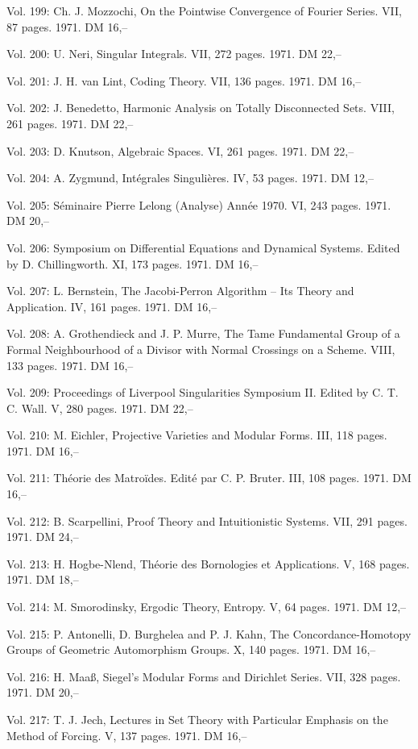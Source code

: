 Vol. 199: Ch. J. Mozzochi, On the Pointwise Convergence of Fourier Series. VII, 87 pages. 1971. DM 16,--

Vol. 200: U. Neri, Singular Integrals. VII, 272 pages. 1971. DM 22,--

Vol. 201: J. H. van Lint, Coding Theory. VII, 136 pages. 1971. DM 16,--

Vol. 202: J. Benedetto, Harmonic Analysis on Totally Disconnected Sets. VIII, 261 pages. 1971. DM 22,--

Vol. 203: D. Knutson, Algebraic Spaces. VI, 261 pages. 1971. DM 22,--

Vol. 204: A. Zygmund, Intégrales Singulières. IV, 53 pages. 1971. DM 12,--

Vol. 205: Séminaire Pierre Lelong (Analyse) Année 1970. VI, 243 pages. 1971. DM 20,--

Vol. 206: Symposium on Differential Equations and Dynamical Systems. Edited by D. Chillingworth. XI, 173 pages. 1971. DM 16,--

Vol. 207: L. Bernstein, The Jacobi-Perron Algorithm -- Its Theory and Application. IV, 161 pages. 1971. DM 16,--

Vol. 208: A. Grothendieck and J. P. Murre, The Tame Fundamental Group of a Formal Neighbourhood of a Divisor with Normal Crossings on a Scheme. VIII, 133 pages. 1971. DM 16,--

Vol. 209: Proceedings of Liverpool Singularities Symposium II. Edited by C. T. C. Wall. V, 280 pages. 1971. DM 22,--

Vol. 210: M. Eichler, Projective Varieties and Modular Forms. III, 118 pages. 1971. DM 16,--

Vol. 211: Théorie des Matroïdes. Edité par C. P. Bruter. III, 108 pages. 1971. DM 16,--

Vol. 212: B. Scarpellini, Proof Theory and Intuitionistic Systems. VII, 291 pages. 1971. DM 24,--

Vol. 213: H. Hogbe-Nlend, Théorie des Bornologies et Applications. V, 168 pages. 1971. DM 18,--

Vol. 214: M. Smorodinsky, Ergodic Theory, Entropy. V, 64 pages. 1971. DM 12,--

Vol. 215: P. Antonelli, D. Burghelea and P. J. Kahn, The Concordance-Homotopy Groups of Geometric Automorphism Groups. X, 140 pages. 1971. DM 16,--

Vol. 216: H. Maaß, Siegel's Modular Forms and Dirichlet Series. VII, 328 pages. 1971. DM 20,--

Vol. 217: T. J. Jech, Lectures in Set Theory with Particular Emphasis on the Method of Forcing. V, 137 pages. 1971. DM 16,--

